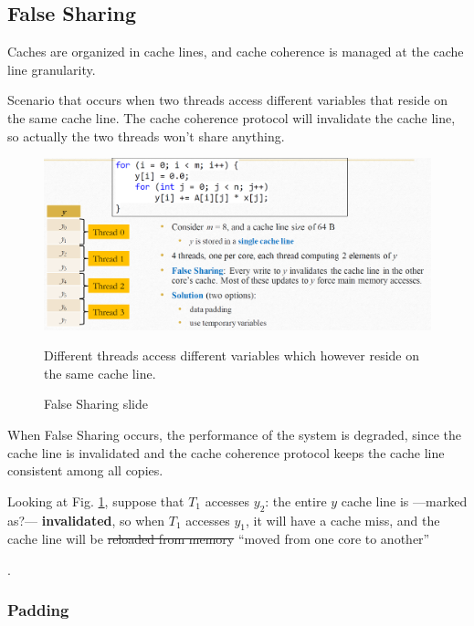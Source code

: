 \subsection{False Sharing}
Caches are organized in cache lines, and cache coherence is managed at the cache line granularity. 
\begin{definition}
    Scenario that occurs when two threads access different variables that reside on the same cache line. The cache coherence protocol will invalidate the cache line, so actually the two threads won't share anything.
\end{definition}


\begin{figure}[htbp]
   \centering
   \includegraphics{images/04/false_sharing.png}
   \caption{False Sharing slide}
   Different threads access different variables which however reside on the same cache line.
   \label{fig:04/false_sharing}
\end{figure}
When False Sharing occurs, the performance of the system is degraded, since the cache line is invalidated and the cache coherence protocol keeps the cache line consistent among all copies.

Looking at Fig. \ref{fig:04/false_sharing}, suppose that $T_1$ accesses $y_2$:
the entire $y$ cache line is ---marked as?--- \textbf{invalidated}, so when $T_1$ accesses $y_1$, it will have a cache miss, and the cache line will be \st{reloaded from memory} ``moved from one core to another''\footnotemark[2]


.

\newpage

\subsubsection{Padding}

